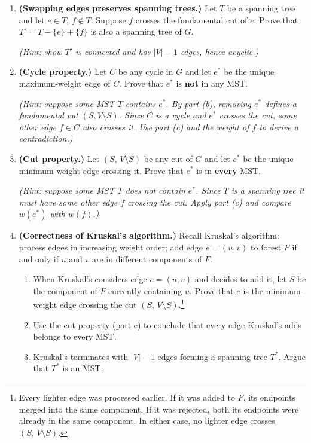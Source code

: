 \documentclass[9pt]{book}
\begin{document}
\begin{enumerate}[label=\arabic*.]
\begin{enumerate}
    \item \textbf{(Swapping edges preserves spanning trees.)}
    Let $T$ be a spanning tree and let $e \in T$, $f \notin T$. Suppose $f$ crosses the fundamental cut of $e$. Prove that $T' = T - \{e\} + \{f\}$ is also a spanning tree of $G$.

    \textit{(Hint: show $T'$ is connected and has $|V|-1$ edges, hence acyclic.)}

    \item \textbf{(Cycle property.)}
    Let $C$ be any cycle in $G$ and let $e^*$ be the unique maximum-weight edge of $C$. Prove that $e^*$ is \textbf{not} in any MST.

    \textit{(Hint: suppose some MST $T$ contains $e^*$. By part (b), removing $e^*$ defines a fundamental cut $(S, V \setminus S)$. Since $C$ is a cycle and $e^*$ crosses the cut, some other edge $f \in C$ also crosses it. Use part (c) and the weight of $f$ to derive a contradiction.)}

    \item \textbf{(Cut property.)}
    Let $(S,\, V \setminus S)$ be any cut of $G$ and let $e^*$ be the unique minimum-weight edge crossing it. Prove that $e^*$ is in \textbf{every} MST.

    \textit{(Hint: suppose some MST $T$ does not contain $e^*$. Since $T$ is a spanning tree it must have some other edge $f$ crossing the cut. Apply part (c) and compare $w(e^*)$ with $w(f)$.)}

    \item \textbf{(Correctness of Kruskal's algorithm.)}
    Recall Kruskal's algorithm: process edges in increasing weight order; add edge $e = (u,v)$ to forest $F$ if and only if $u$ and $v$ are in different components of $F$.

    \begin{enumerate}
        \item When Kruskal's considers edge $e = (u,v)$ and decides to add it, let $S$ be the component of $F$ currently containing $u$. Prove that $e$ is the minimum-weight edge crossing the cut $(S,\, V \setminus S)$.\footnote{Every lighter edge was processed earlier. If it was added to $F$, its endpoints merged into the same component. If it was rejected, both its endpoints were already in the same component. In either case, no lighter edge crosses $(S,\, V \setminus S)$.}
        \item Use the cut property (part e) to conclude that every edge Kruskal's adds belongs to every MST.
        \item Kruskal's terminates with $|V|-1$ edges forming a spanning tree $T^*$. Argue that $T^*$ is an MST.
    \end{enumerate}


\end{enumerate}
\end{enumerate}
\end{document}
